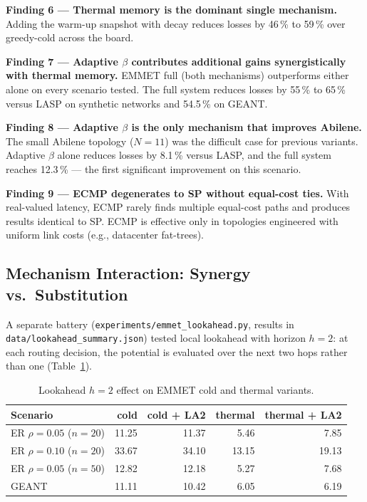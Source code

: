 \documentclass[11pt,a4paper]{article}
\begin{document}
\textbf{Finding 6 --- Thermal memory is the dominant single mechanism.}
Adding the warm-up snapshot with decay reduces losses by 46\,\% to
59\,\% over greedy-cold across the board.

\textbf{Finding 7 --- Adaptive $\beta$ contributes additional gains
synergistically with thermal memory.} EMMET full (both mechanisms)
outperforms either alone on every scenario tested. The full system
reduces losses by 55\,\% to 65\,\% versus LASP on synthetic networks
and 54.5\,\% on GEANT.

\textbf{Finding 8 --- Adaptive $\beta$ is the only mechanism that
improves Abilene.} The small Abilene topology ($N{=}11$) was the
difficult case for previous variants. Adaptive $\beta$ alone reduces
losses by 8.1\,\% versus LASP, and the full system reaches 12.3\,\%
--- the first significant improvement on this scenario.

\textbf{Finding 9 --- ECMP degenerates to SP without equal-cost
ties.} With real-valued latency, ECMP rarely finds multiple equal-cost
paths and produces results identical to SP. ECMP is effective only in
topologies engineered with uniform link costs (e.g., datacenter
fat-trees).

\subsection{Mechanism Interaction: Synergy vs.\ Substitution}

A separate battery
(\texttt{experiments/emmet\_lookahead.py}, results in
\texttt{data/lookahead\_summary.json}) tested local lookahead with
horizon $h{=}2$: at each routing decision, the potential is evaluated
over the next two hops rather than one (Table~\ref{tab:lookahead}).

\begin{table}[h]
\centering
\caption{Lookahead $h{=}2$ effect on EMMET cold and thermal variants.}
\label{tab:lookahead}
\begin{tabular}{lrrrr}
\toprule
Scenario & cold & cold + LA2 & thermal & thermal + LA2 \\
\midrule
ER $\rho{=}0.05$ ($n{=}20$) & 11.25 & 11.37 & 5.46  & 7.85  \\
ER $\rho{=}0.10$ ($n{=}20$) & 33.67 & 34.10 & 13.15 & 19.13 \\
ER $\rho{=}0.05$ ($n{=}50$) & 12.82 & 12.18 & 5.27  & 7.68  \\
GEANT                       & 11.11 & 10.42 & 6.05  & 6.19  \\
\bottomrule
\end{tabular}
\end{table}
\end{document}
